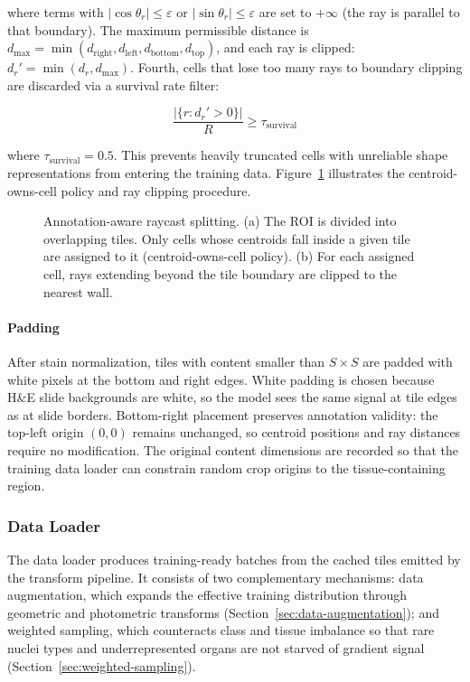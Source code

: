 where terms with $|\cos\theta_r| \leq \varepsilon$ or $|\sin\theta_r| \leq \varepsilon$ are set to $+\infty$ (the ray is parallel to that boundary). The maximum permissible distance is $d_{\max} = \min(d_{\text{right}}, d_{\text{left}}, d_{\text{bottom}}, d_{\text{top}})$, and each ray is clipped: $d_r' = \min(d_r, d_{\max})$. Fourth, cells that lose too many rays to boundary clipping are discarded via a survival rate filter:

\begin{equation}
    \frac{|\{r : d_r' > 0\}|}{R} \geq \tau_{\text{survival}}
\end{equation}

where $\tau_{\text{survival}} = 0.5$. This prevents heavily truncated cells with unreliable shape representations from entering the training data. Figure~\ref{fig:annotation-splitting} illustrates the centroid-owns-cell policy and ray clipping procedure.

\begin{figure}[H]
    \centering
    \resizebox{0.95\textwidth}{!}{}
    \caption[Annotation-aware raycast splitting.]{Annotation-aware raycast splitting. (a) The ROI is divided into overlapping tiles. Only cells whose centroids fall inside a given tile are assigned to it (centroid-owns-cell policy). (b) For each assigned cell, rays extending beyond the tile boundary are clipped to the nearest wall.}
    \label{fig:annotation-splitting}
\end{figure}

\paragraph{Padding}
After stain normalization, tiles with content smaller than $S \times S$ are padded with white pixels at the bottom and right edges. White padding is chosen because H\&E slide backgrounds are white, so the model sees the same signal at tile edges as at slide borders. Bottom-right placement preserves annotation validity: the top-left origin $(0, 0)$ remains unchanged, so centroid positions and ray distances require no modification. The original content dimensions are recorded so that the training data loader can constrain random crop origins to the tissue-containing region.
\subsubsection{Data Loader}

The data loader produces training-ready batches from the cached tiles emitted by the transform pipeline. It consists of two complementary mechanisms: data augmentation, which expands the effective training distribution through geometric and photometric transforms (Section~\ref{sec:data-augmentation}); and weighted sampling, which counteracts class and tissue imbalance so that rare nuclei types and underrepresented organs are not starved of gradient signal (Section~\ref{sec:weighted-sampling}).

